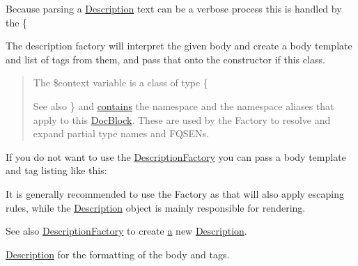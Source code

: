 Because parsing a \mbox{\hyperlink{classphp_documentor_1_1_reflection_1_1_doc_block_1_1_description}{Description}} text can be a verbose process this is handled by the \{
The description factory will interpret the given body and create a body template and list of tags from them, and pass that onto the constructor if this class.

\begin{quote}
The \$context variable is a class of type \{\begin{DoxySeeAlso}{See also}
\} and \mbox{\hyperlink{_functions_8php_a9dba79f2c57b5f522b794f8c0e029bec}{contains}} the namespace and the namespace aliases that apply to this \mbox{\hyperlink{classphp_documentor_1_1_reflection_1_1_doc_block}{Doc\+Block}}. These are used by the Factory to resolve and expand partial type names and F\+Q\+S\+E\+Ns. 
\end{DoxySeeAlso}
\end{quote}


If you do not want to use the \mbox{\hyperlink{classphp_documentor_1_1_reflection_1_1_doc_block_1_1_description_factory}{Description\+Factory}} you can pass a body template and tag listing like this\+: 


It is generally recommended to use the Factory as that will also apply escaping rules, while the \mbox{\hyperlink{classphp_documentor_1_1_reflection_1_1_doc_block_1_1_description}{Description}} object is mainly responsible for rendering.

\begin{DoxySeeAlso}{See also}
\mbox{\hyperlink{classphp_documentor_1_1_reflection_1_1_doc_block_1_1_description_factory}{Description\+Factory}} to create \mbox{\hyperlink{interfacea}{a}} new \mbox{\hyperlink{classphp_documentor_1_1_reflection_1_1_doc_block_1_1_description}{Description}}. 

\mbox{\hyperlink{classphp_documentor_1_1_reflection_1_1_doc_block_1_1_description}{Description}} for the formatting of the body and tags. 
\end{DoxySeeAlso}


